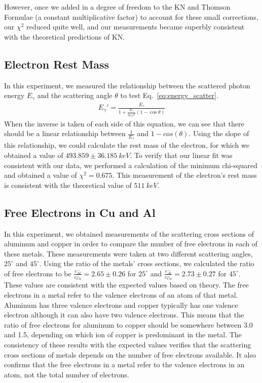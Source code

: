 \documentclass[%
 reprint,
 amsmath,amssymb,
 aps,
 pra,
]{revtex4-1}
\begin{document}
However, once we added in a degree of freedom to the KN and Thomson Formulae (a constant multiplicative factor) to account for these small corrections, our $\chi^2$ reduced quite well, and our measurements became superbly consistent with the theoretical predictions of KN. 

\subsection{Electron Rest Mass}
In this experiment, we measured the relationship between the scattered photon energy $E_{\gamma}$ and the scattering angle $\theta$ to test Eq.~\ref{eq:energy_scatter}.
\begin{gather*}
	E_\gamma ' = \frac{E_\gamma}{1 + \frac{E_\gamma}{m_e c^2} (1 - \cos{\theta})}
\end{gather*}
When the inverse is taken of each side of this equation, we can see that there should be a linear relationship between $\frac{1}{E_{\gamma}}$ and $1 - cos(\theta)$. Using the slope of this relationship, we could calculate the rest mass of the electron, for which we obtained a value of $493.859 \pm 36.185 ~keV$. To verify that our linear fit was consistent with our data, we performed a calculation of the minimum chi-squared and obtained a value of $\chi^{2} = 0.675$.  This measurement of the electron's rest mass is consistent with the theoretical value of $511~ keV$. 

\subsection{Free Electrons in Cu and Al}
In this experiment, we obtained measurements of the scattering cross sections of aluminum and copper in order to compare the number of free electrons in each of these metals. These measurements were taken at two different scattering angles, $25^{\circ}$ and $45^{\circ}$. Using the ratio of the metals' cross sections, we calculated the ratio of free electrons to be $\frac{e^{-}_{Al}}{e^{-}_{Cu}} = 2.65 \pm 0.26$ for $25^{\circ}$ and $\frac{e^{-}_{Al}}{e^{-}_{Cu}} = 2.73 \pm 0.27$ for $45^{\circ}$. These values are consistent with the expected values based on theory. The free electrons in a metal refer to the valence electrons of an atom of that metal. Aluminum has three valence electrons and copper typically has one valence electron although it can also have two valence electrons. This means that the ratio of free electrons for aluminum to copper should be somewhere between 3.0 and 1.5, depending on which ion of copper is predominant in the metal. The consistency of these results with the expected values verifies that the scattering cross sections of metals depends on the number of free electrons available. It also confirms that the free electrons in a metal refer to the valence electrons in an atom, not the total number of electrons.
\end{document}
